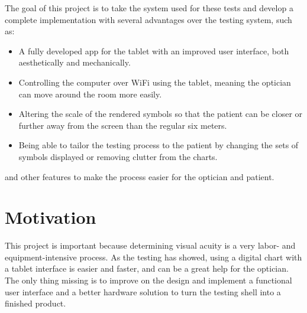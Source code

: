 \documentclass[12pt,a4paper,notitlepage]{report}
\begin{document}
The goal of this project is to take the system used for these tests and develop a complete implementation with several advantages over the testing system, such as:

\begin{itemize}
	\item A fully developed app for the tablet with an improved user interface, both aesthetically and mechanically.
	\item Controlling the computer over WiFi using the tablet, meaning the optician can move around the room more easily.
	\item Altering the scale of the rendered symbols so that the patient can be closer or further away from the screen than the regular six meters.
	\item Being able to tailor the testing process to the patient by changing the sets of symbols displayed or removing clutter from the charts.
\end{itemize}
	
and other features to make the process easier for the optician and patient.




\section{Motivation}

This project is important because determining visual acuity is a very labor- and equipment-intensive process. As the testing has showed, using a digital chart with a tablet interface is easier and faster, and can be a great help for the optician. The only thing missing is to improve on the design and implement a functional user interface and a better hardware solution to turn the testing shell into a finished product. 

\end{document}
